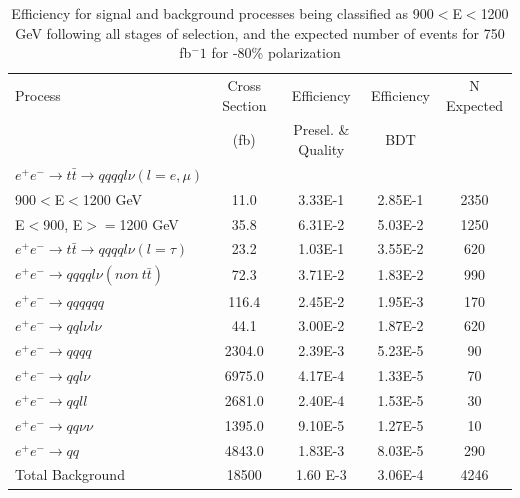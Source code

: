 \begin{table}
  \centering
  \begin{tabular}{l | c | c | c | c}
    \toprule
     Process     & Cross Section & Efficiency & Efficiency & N Expected\\
     & (fb) & Presel. \& Quality & BDT & \\
     \midrule
    $e^+e^-\rightarrow t\bar{t} \rightarrow qqqql\nu (l=e,\mu)$&  &  & &\\
    900$<$E$<$1200 GeV & 11.0 & 3.33E-1 & 2.85E-1 & 2350\\
    E$<$900, E$>=$1200 GeV & 35.8 & 6.31E-2 & 5.03E-2 & 1250 \\
    \midrule
    $e^+e^-\rightarrow t\bar{t} \rightarrow qqqql\nu (l=\tau)$& 23.2 & 1.03E-1  & 3.55E-2 & 620 \\
    \midrule
    $e^+e^-\rightarrow qqqql\nu (non ~ t\bar{t})$& 72.3 & 3.71E-2 & 1.83E-2 & 990\\
    \midrule
    $e^+e^-\rightarrow qqqqqq$ & 116.4 & 2.45E-2 & 1.95E-3& 170 \\
    \midrule
    $e^+e^-\rightarrow qql\nu l\nu$ & 44.1 & 3.00E-2 & 1.87E-2 & 620\\
    \midrule
    $e^+e^-\rightarrow qqqq$ & 2304.0 & 2.39E-3 & 5.23E-5 & 90 \\
    \midrule
    $e^+e^-\rightarrow qql\nu$ & 6975.0 & 4.17E-4& 1.33E-5& 70 \\
    \midrule
    $e^+e^-\rightarrow qqll$ & 2681.0 & 2.40E-4& 1.53E-5 & 30 \\
    \midrule
    $e^+e^-\rightarrow qq\nu\nu$ & 1395.0 & 9.10E-5 & 1.27E-5 & 10 \\
    \midrule
    $e^+e^-\rightarrow qq$ & 4843.0 & 1.83E-3 & 8.03E-5 & 290\\
    \midrule
    \midrule
    Total Background & 18500 & 1.60 E-3 & 3.06E-4&  4246 \\
    \bottomrule
  \end{tabular}
  \caption{Efficiency for signal and background processes being classified as 900$<$E$<$1200 GeV following all stages of selection, and the expected number of events for 750 fb$^-1$ for -80\% polarization}
  \label{table:topfinalefficienciesnegMidE}
\end{table}

